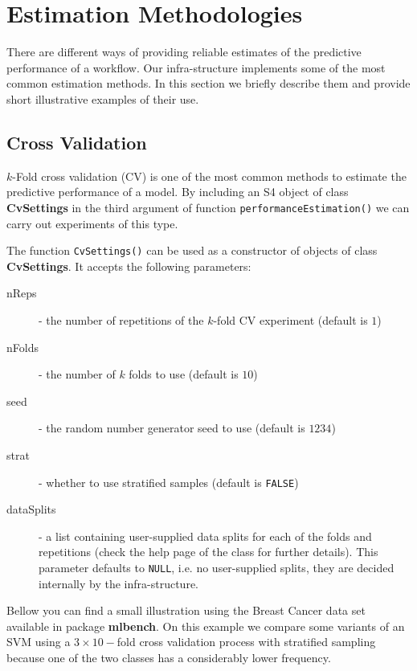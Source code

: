 \documentclass[10pt,a4paper]{article}\usepackage[]{graphicx}\usepackage[]{color}
\begin{document}
\section{Estimation Methodologies}\label{sec:expMeth}

There are different ways of providing reliable estimates of the
predictive performance of a workflow. Our infra-structure implements some
of the most common estimation methods. In this section we
briefly describe them and provide short illustrative examples of their
use.

\subsection{Cross Validation}

$k$-Fold cross validation (CV) is one of the most common 
methods to estimate the predictive performance of a model. By
including an S4 object of class \textbf{CvSettings} in the third
argument of function \texttt{performanceEstimation()} we can carry
out experiments of this type.

The function \texttt{CvSettings()} can be used as a constructor of objects
of class \textbf{CvSettings}. It accepts the following parameters:

\begin{description}
\item[nReps] - the number of repetitions of the $k$-fold CV experiment (default is $1$)
\item[nFolds] - the number of $k$ folds to use (default is $10$)
\item[seed] - the random number generator seed to use (default is $1234$)
\item[strat] - whether to use stratified samples (default is \texttt{FALSE})
\item[dataSplits] - a list containing user-supplied data splits
  for each of the folds and repetitions (check the help page of the
  class for further details). This parameter defaults to
  \texttt{NULL}, i.e. no user-supplied splits, they are decided
  internally by the infra-structure.
\end{description}

Bellow you can find a small illustration using the Breast Cancer data
set available in package \textbf{mlbench}. On this example we compare
some variants of an SVM using a $3\times 10-$fold cross validation
process with stratified sampling because one of the two classes has a
considerably lower frequency.
\end{document}
